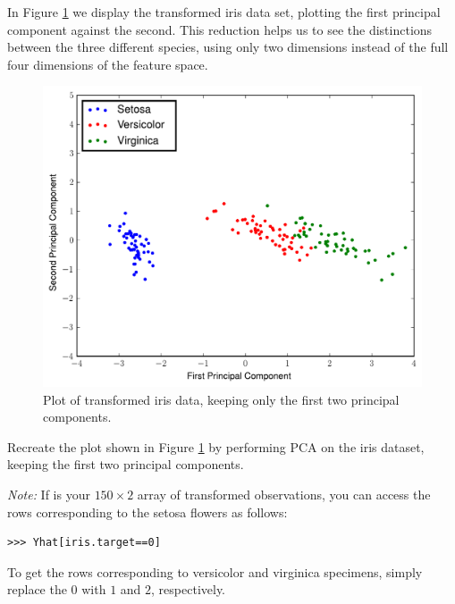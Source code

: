 In Figure \ref{fig:iris_pca} we display the transformed iris data set, plotting the first principal component against the second. This reduction helps us to see the distinctions between the three different species, using only two dimensions instead of the full four dimensions of the feature space.
\begin{figure}
\includegraphics[width=\textwidth]{iris_pca.pdf}
\caption{Plot of transformed iris data, keeping only the first two principal components.}
\label{fig:iris_pca}
\end{figure}

\begin{problem}
Recreate the plot shown in Figure \ref{fig:iris_pca} by performing PCA on the iris dataset, keeping the first two principal components. 

\emph{Note:}
If  is your $150 \times 2$ array of transformed observations, you can access the rows corresponding to the setosa flowers as follows:
\begin{lstlisting}
>>> Yhat[iris.target==0]
\end{lstlisting}
To get the rows corresponding to versicolor and virginica specimens, simply replace the $0$ with $1$ and $2$, respectively.
\end{problem}

